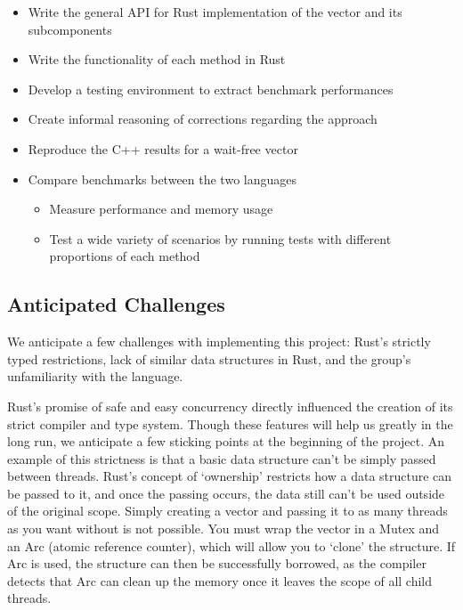 \documentclass[conference]{IEEEtran}
\begin{document}
\begin{itemize}

    \item Write the general API for Rust implementation of the vector and its subcomponents
    \item Write the functionality of each method in Rust
    \item Develop a testing environment to extract benchmark performances
    \item Create informal reasoning of corrections regarding the approach
    
    
    \item Reproduce the C++ results for a wait-free vector
    \item Compare benchmarks between the two languages
    \begin{itemize}
        \item Measure performance and memory usage
        \item Test a wide variety of scenarios by running tests with different proportions of each method
    \end{itemize}
    
\end{itemize}

\subsection{Anticipated Challenges}
We anticipate a few challenges with implementing this project: Rust’s strictly typed restrictions, lack of similar data structures in Rust, and the group’s unfamiliarity with the language.

Rust's promise of safe and easy concurrency directly influenced the creation of its strict compiler and type system. Though these features will help us greatly in the long run, we anticipate a few sticking points at the beginning of the project. An example of this strictness is that a basic data structure can’t be simply passed between threads. Rust's concept of ‘ownership’ restricts how a data structure can be passed to it, and once the passing occurs, the data still can't be used outside of the original scope. Simply creating a vector and passing it to as many threads as you want without is not possible. You must wrap the vector in a Mutex and an Arc (atomic reference counter), which will allow you to ‘clone’ the structure. If Arc is used, the structure can then be successfully borrowed, as the compiler detects that Arc can clean up the memory once it leaves the scope of all child threads. 
\end{document}
